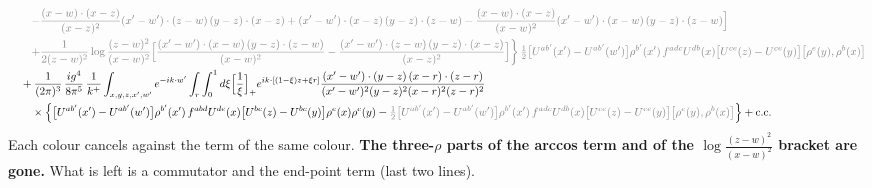 \documentclass[10pt]{article}
\newcommand{\Gr}[1]{{\color{cX}#1}}
\begin{document}
\begin{align}
&\qquad\Gr{-\frac{(x-w)\cdot(x-z)}{(x-z)^{2}}(x'-w')\cdot(z-w)\,(y-z)\cdot(x-z)+(x'-w')\cdot(x-z)\,(y-z)\cdot(z-w)-\frac{(x-w)\cdot(x-z)}{(x-w)^{2}}(x'-w')\cdot(x-w)\,(y-z)\cdot(z-w)\Big]}\notag\\
&\qquad\Gr{+\frac{1}{2(z-w)^{2}}\log\frac{(z-w)^{2}}{(x-w)^{2}}\Big[\frac{(x'-w')\cdot(x-w)\,(y-z)\cdot(z-w)}{(x-w)^{2}}-\frac{(x'-w')\cdot(z-w)\,(y-z)\cdot(x-z)}{(x-z)^{2}}\Big]\bigg\}\,\tfrac12\big[U^{ab'}(x')-U^{ab'}(w')\big]\rho^{b'}(x')\,f^{adc}U^{db}(x)\big[U^{ce}(z)-U^{ce}(y)\big]\big[\rho^{e}(y),\rho^{b}(x)\big]}\notag\\
&\quad+\frac{1}{(2\pi)^{3}}\,\frac{ig^{4}}{8\pi^{5}}\,\frac{1}{k^{+}}\int_{x,y,z,x',w'}e^{-ik\cdot w'}\int_{r}\int_{0}^{1}d\xi\Big[\frac1\xi\Big]_{+}e^{ik\cdot[(1-\xi)z+\xi r]}\frac{(x'-w')\cdot(y-z)\,(x-r)\cdot(z-r)}{(x'-w')^{2}(y-z)^{2}(x-r)^{2}(z-r)^{2}}\notag\\
&\qquad\times\Big\{\big[U^{ab'}(x')-U^{ab'}(w')\big]\rho^{b'}(x')\,f^{abd}U^{de}(x)\big[U^{bc}(z)-U^{bc}(y)\big]\rho^{e}(x)\rho^{c}(y)-\Gr{\tfrac12\big[U^{ab'}(x')-U^{ab'}(w')\big]\rho^{b'}(x')\,f^{adc}U^{db}(x)\big[U^{ce}(z)-U^{ce}(y)\big]\big[\rho^{e}(y),\rho^{b}(x)\big]}\Big\}+{\rm c.c.}
\end{align}
Each colour cancels against the term of the same colour. \textbf{The three-$\rho$ parts of the arccos term and of the $\log\frac{(z-w)^{2}}{(x-w)^{2}}$ bracket are gone.} What is left is a \Gr{commutator} and the end-point term (last two lines).
\end{document}
